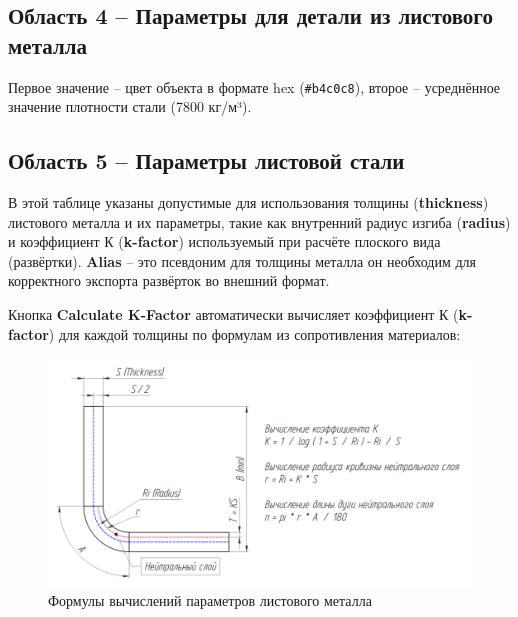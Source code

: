 \documentclass[a4paper,12pt]{article}
\begin{document}
\subsection{Область 4 -- Параметры для детали из листового металла}
Первое значение -- цвет объекта в формате hex (\verb|#b4c0c8|), второе -- усреднённое значение плотности стали (7800 кг/м³).

\subsection{Область 5 -- Параметры листовой стали}
В этой таблице указаны допустимые для использования толщины (\textbf{thickness}) листового металла и их параметры, такие как внутренний радиус изгиба (\textbf{radius}) и коэффициент К (\textbf{k-factor}) используемый при расчёте плоского вида (развёртки). \textbf{Alias} -- это псевдоним для толщины металла он необходим для корректного экспорта развёрток во внешний формат.\\


\pagebreak


Кнопка \textbf{Calculate K-Factor} автоматически вычисляет коэффициент К (\textbf{k-factor}) для каждой толщины по формулам из сопротивления материалов:

\begin{figure}[htp]
	\centering
	\includegraphics[width=1\textwidth]{img/k_ru.png}
	\caption{Формулы вычислений параметров листового металла}
	\label{sec:k}
\end{figure}

\pagebreak
\end{document}
